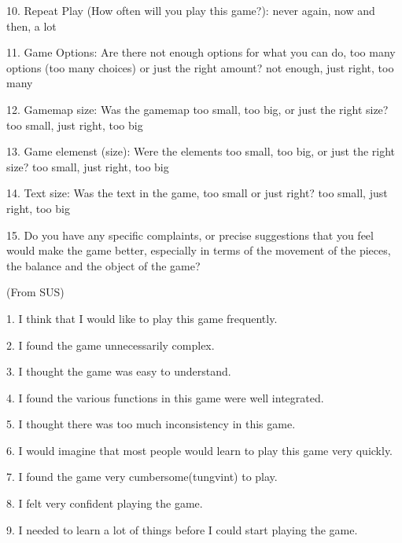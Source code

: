 10. Repeat Play (How often will you play this game?): never again, now and then, a lot

11. Game Options:  Are there not enough options for what you can do, too many options (too many choices) or just the right amount? not enough, just right, too many

12. Gamemap size: Was the gamemap too small, too big, or just the right size? too small, just right, too big

13. Game elemenst (size): Were the elements too small, too big, or just the right size? too small, just right, too big

14. Text size: Was the text in the game, too small or just right? too small, just right, too big

15. Do you have any specific complaints, or precise suggestions that you feel would make the game better, especially in terms of the movement of the pieces, the balance and the object of the game?

(From SUS)

1. I think that I would like to play this game frequently.

2. I found the game unnecessarily complex.

3. I thought the game was easy to understand.

4. I found the various functions in this game were well integrated.

5. I thought there was too much inconsistency in this game.

6. I would imagine that most people would learn to play this game very quickly.

7. I found the game very cumbersome(tungvint) to play.

8. I felt very confident playing the game.

9. I needed to learn a lot of things before I could start playing the game.




